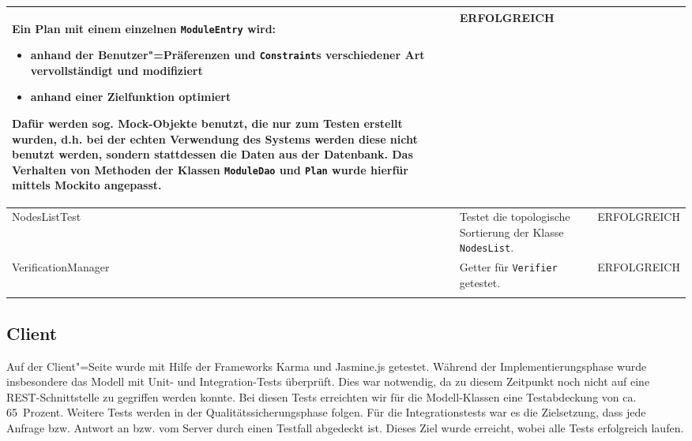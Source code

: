 \begin{longtable}{| >{\hspace{0pt}} p{} | >{\hspace{0pt}} p{} | >{\hspace{0pt}} p{} |}
	Ein Plan mit einem einzelnen \texttt{ModuleEntry} wird:
	\begin{itemize}
		\item anhand der Benutzer"=Präferenzen und \texttt{Constraint}s verschiedener Art vervollständigt und modifiziert
		\item anhand einer Zielfunktion optimiert
	\end{itemize}
	Dafür werden sog. Mock-Objekte benutzt, die nur zum Testen erstellt wurden, d.h. bei der echten Verwendung des Systems werden diese nicht benutzt werden, sondern stattdessen die Daten aus der Datenbank. Das Verhalten von Methoden der Klassen \texttt{ModuleDao} und \texttt{Plan} wurde hierfür mittels Mockito angepasst. & ERFOLGREICH\\
	\hline
	NodesListTest & Testet die topologische Sortierung der Klasse \texttt{NodesList}. & ERFOLGREICH\\
	\hline
	VerificationManager & Getter für \texttt{Verifier} getestet. & ERFOLGREICH\\
	\hhline{|=|=|=|} 
\end{longtable}

\subsection{Client}
Auf der Client"=Seite wurde mit Hilfe der Frameworks Karma und Jasmine.js getestet.
Während der Implementierungsphase wurde insbesondere das Modell mit Unit- und Integration-Tests überprüft.
Dies war notwendig, da zu diesem Zeitpunkt noch nicht auf eine REST-Schnittstelle zu gegriffen werden konnte.
Bei diesen Tests erreichten wir für die Modell-Klassen eine Testabdeckung von ca. 65~Prozent. Weitere Tests werden in der Qualitätssicherungsphase folgen.
Für die Integrationstests war es die Zielsetzung, dass jede Anfrage bzw. Antwort an bzw. vom Server durch einen Testfall abgedeckt ist.
Dieses Ziel wurde erreicht, wobei alle Tests erfolgreich laufen.

